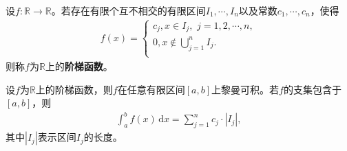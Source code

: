 \documentclass[../../main.tex]{subfiles}%
\begin{document}
\begin{definition}[阶梯函数]
设$f:\mathbb{R}\to\mathbb{R}$。若存在有限个互不相交的有限区间$I_1,\cdots,I_n$以及常数$c_1,\cdots,c_n$，使得
\begin{align*}
f(x)=\begin{cases}
c_j,x\in I_j,\,\,j=1,2,\cdots ,n,\\
0,x\notin \bigcup_{j=1}^n{I_j}.\\
\end{cases}
\end{align*}
则称$f$为$\mathbb{R}$上的\textbf{阶梯函数}。
\end{definition}

\begin{proposition}
设$f$为$\mathbb{R}$上的阶梯函数，则$f$在任意有限区间$[a,b]$上黎曼可积。若$f$的支集包含于$[a,b]$，则
\begin{align*}
\int_{a}^{b} f(x)\,\mathrm{d}x = \sum_{j=1}^{n} c_j \cdot |I_j|,
\end{align*}
其中$|I_j|$表示区间$I_j$的长度。
\end{proposition}
\end{document}

